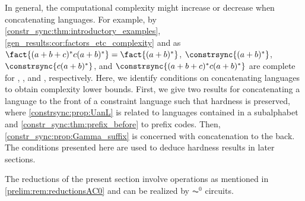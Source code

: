 
In general, the computational complexity might increase or decrease
when concatenating languages.
For example, 
by \cref{constr_sync:thm:introductory_examples},
\cref{gen_results:cor:factors_etc_complexity}
and as $\fact{(a+b+c)^*c(a+b)^*} = \fact{(a+b)^*}$,
$\constrsync{(a+b)^*}$, $\constrsync{c(a+b)^*}$,
and $\constrsync{(a+b+c)^*c(a+b)^*}$ are 
complete for \NL, \PSPACE, and \NL, respectively.
Here, we identify conditions on concatenating languages
to obtain complexity lower bounds.
First, we give two results
for concatenating a language
to the front of a constraint language such that hardness is preserved, where
\cref{constrsync:prop:UanL} is related to languages contained in a subalphabet
and \cref{constr_sync:thm:prefix_before} to prefix codes.
Then, \cref{constr_sync:prop:Gamma_suffix}
is concerned with concatenation to the back.
The conditions presented here are used to deduce hardness results in later sections.

The reductions of the present section involve operations
as mentioned in \cref{prelim:rem:reductionsAC0}
and can be realized by $\AC^0$ circuits.


